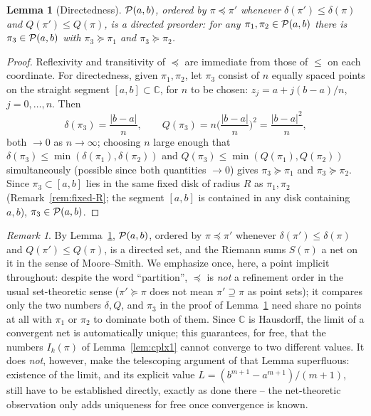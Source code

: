\documentclass[11pt,fleqn]{article}
\def\C{\mathbb C}
\theoremstyle{plain}
\newtheorem{lemma}[thm]{Lemma}
\theoremstyle{remark}
\newtheorem{remark}[thm]{Remark}
\begin{document}
\begin{lemma}[Directedness]\label{lem:directed}
${\cal P}(a,b)$, ordered by $\pi\preceq\pi'$ whenever
$\delta(\pi')\le\delta(\pi)$ and $Q(\pi')\le Q(\pi)$, is a directed
preorder: for any $\pi_1,\pi_2\in{\cal P}(a,b)$ there is
$\pi_3\in{\cal P}(a,b)$ with $\pi_3\succeq\pi_1$ and $\pi_3\succeq\pi_2$.
\end{lemma}
\begin{proof}
Reflexivity and transitivity of $\preceq$ are immediate from those of
$\le$ on each coordinate. For directedness, given $\pi_1,\pi_2$, let
$\pi_3$ consist of $n$ equally spaced points on the straight segment
$[a,b]\subset\C$, for $n$ to be chosen: $z_j=a+j(b-a)/n$,
$j=0,\ldots,n$. Then
\[
\delta(\pi_3)=\frac{|b-a|}n,\qquad
Q(\pi_3)=n\Big(\frac{|b-a|}n\Big)^2=\frac{|b-a|^2}n,
\]
both $\to0$ as $n\to\infty$; choosing $n$ large enough that
$\delta(\pi_3)\le\min(\delta(\pi_1),\delta(\pi_2))$ and
$Q(\pi_3)\le\min(Q(\pi_1),Q(\pi_2))$ simultaneously (possible since both
quantities $\to0$) gives $\pi_3\succeq\pi_1$ and $\pi_3\succeq\pi_2$.
Since $\pi_3\subset[a,b]$ lies in the same fixed disk of radius $R$ as
$\pi_1,\pi_2$ (Remark~\ref{rem:fixed-R}; the segment $[a,b]$ is contained
in any disk containing $a,b$), $\pi_3\in{\cal P}(a,b)$.
\end{proof}

\begin{remark}\label{rem:strange-order}
By Lemma~\ref{lem:directed}, ${\cal P}(a,b)$, ordered by
$\pi\preceq\pi'$ whenever $\delta(\pi')\le\delta(\pi)$
and $Q(\pi')\le Q(\pi)$, is a directed set, and the Riemann sums
$S(\pi)$ a net on it in the sense of Moore--Smith. We emphasize once,
here, a point implicit throughout: despite the word ``partition'',
$\preceq$ is \emph{not} a refinement order in the usual set-theoretic
sense ($\pi'\succeq\pi$ does not mean $\pi'\supseteq\pi$ as point sets);
it compares only the two numbers $\delta,Q$, and $\pi_3$ in the proof of
Lemma~\ref{lem:directed} need share no points at all with $\pi_1$ or
$\pi_2$ to dominate both of them. Since $\C$ is Hausdorff,
the limit of a convergent net is automatically unique; this guarantees, for
free, that the numbers $I_k(\pi)$ of Lemma~\ref{lem:cplx1} cannot converge
to two different values. It does \emph{not}, however, make the telescoping
argument of that Lemma superfluous: existence of the limit, and its
explicit value $L=(b^{m+1}-a^{m+1})/(m+1)$, still have to be established
directly, exactly as done there -- the net-theoretic observation only adds
uniqueness for free once convergence is known.
\end{remark}
\end{document}
